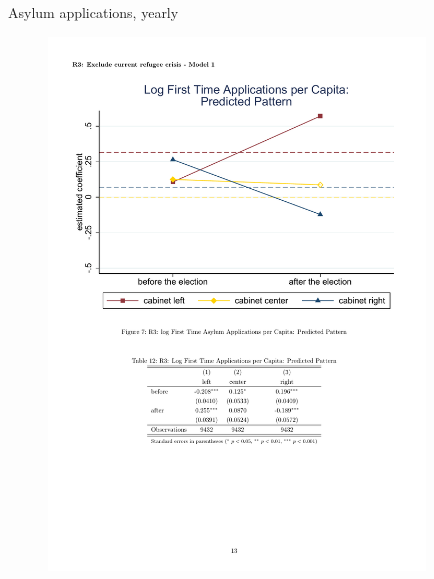 \documentclass{beamer}
\begin{document}
\begin{frame}{Asylum applications, yearly}
\begin{figure}[tb]
\begin{center}
  \includegraphics[width=10cm]{graph1.pdf}
 \end{center}
\end{figure}
\end{frame}
\end{document}
